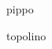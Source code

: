 \documentclass[11pt]{article}
\begin{document}
   pippo

\begin{landscape}
   topolino
\end{landscape}
\end{document}

